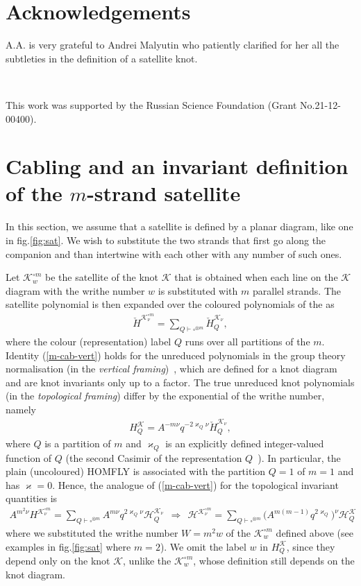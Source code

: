 \documentclass[11pt]{article}
\def\be{\begin{eqnarray}}
\def\ee{\end{eqnarray}}
\def\Hm{\mathcal{H}}
\def\Km{\mathcal{K}}
\begin{document}
\section*{Acknowledgements}
A.A. is very grateful to Andrei Malyutin who patiently clarified for her all the subtleties in the definition of a satellite knot. 

\

This work was supported by the Russian Science Foundation (Grant No.21-12-00400). 

 



\appendix
\section{Cabling and an invariant definition of the $m$-strand satellite\label{app:FT}}
In this section, we assume that a satellite is defined by a planar diagram, like one in fig.\ref{fig:sat}. We wish to substitute the two strands that first go along the companion and than intertwine with each other with any number of such ones.

Let $\Km_w^{\circ m}$ be the satellite of the knot $\Km$ that is obtained when each line on the $\Km$ diagram with the writhe number $w$ is substituted with $m$ parallel strands. The satellite polynomial is then expanded over the coloured polynomials of the as 
\be
\check{H}^{\Km_{\nu}^{\circ m}}=\sum_{Q\vdash \square^{\otimes m}}\check{H}_Q^{\Km_{\nu}},\label{m-cab-vert}
\ee
where the colour (representation) label $Q$ runs over all partitions of the $m$. Identity (\ref{m-cab-vert}) holds for the unreduced polynomials in the group theory normalisation (in the \textit{vertical framing})~\cite{AMcab}, which are defined for a knot diagram and are knot invariants only up to a factor. The true unreduced knot polynomials (in the \textit{topological framing}) differ by the exponential of the writhe number, namely 
\be H^{\Km}_Q=A^{-m\nu}q^{-2\varkappa_Q\nu}\check{H}_Q^{\Km_\nu},\ee
where $Q$ is a partition of $m$ and $\varkappa_Q$ is an explicitly defined integer-valued function of $Q$ (the second Casimir of the representation $Q$~\cite{KlimSch}). In particular, the plain (uncoloured) HOMFLY is associated with the partition $Q=1$ of $m=1$ and has $\varkappa=0$. Hence, the analogue of (\ref{m-cab-vert}) for the topological invariant quantities is 
\be 
A^{m^2\nu}H^{\Km_{\nu}^{\circ m}}=\sum_{Q\vdash \square^{\otimes m}}A^{m\nu}q^{2\varkappa_Q\nu}\Hm_Q^{\Km_{\nu}}\ \ \Rightarrow\ \
\Hm^{\Km_{\nu}^{\circ m}}=\sum_{Q\vdash \square^{\otimes m}}\Big(A^{m(m-1)}q^{2\varkappa_Q}\Big)^{\nu}\Hm_Q^{\Km}\label{m-cab-top}
\ee
where we substituted the writhe number $W=m^2w$ of the $\Km_w^{\circ m}$ defined above (see examples in fig.\ref{fig:sat} where $m=2$). We omit the label $w$ in $H_Q^{\Km}$, since they depend only on the knot $\Km$, unlike the $\Km_w^{\circ m}$, whose definition still depends on the knot diagram.
\end{document}
